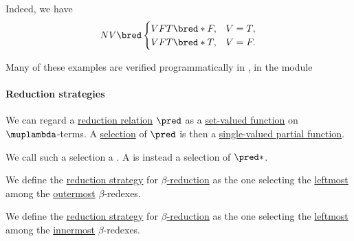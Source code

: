 \begin{example}
\begin{thmenum}
    Indeed, we have
    \begin{equation*}
      NV \bred \begin{cases}
        VFT \bred* F, &V = T, \\
        VFT \bred* T, &V = F.
      \end{cases}
    \end{equation*}
  \end{thmenum}
\end{example}
\begin{comments}
  \item Many of these examples are verified programmatically in \cite{notebook:code}, in the module
  \begin{CodeRefDisplay}
  \end{CodeRefDisplay}
\end{comments}

\paragraph{Reduction strategies}

\begin{definition}\label{def:reduction_strategy}
  We can regard a \hyperref[def:lambda_term_reduction]{reduction relation} \( {\pred} \) as a \hyperref[def:set_valued_function]{set-valued function} on \( \muplambda \)-terms. A \hyperref[def:set_valued_selection]{selection} of \( {\pred} \) is then a \hyperref[def:partial_function]{single-valued partial function}.

  We call such a selection a . A  is instead a selection of \( {\pred*} \).
\end{definition}

\begin{definition}\label{def:normal_order_reduction}
  We define the  \hyperref[def:reduction_strategy]{reduction strategy} for \hyperref[def:beta_eta_reduction]{\( \beta \)-reduction} as the one selecting the \hyperref[def:subterm_occurrence_ordering/horizontal]{leftmost} among the \hyperref[def:subterm_occurrence_ordering/vertical]{outermost} \( \beta \)-redexes.
\end{definition}

\begin{definition}\label{def:applicative_order_reduction}
  We define the  \hyperref[def:reduction_strategy]{reduction strategy} for \hyperref[def:beta_eta_reduction]{\( \beta \)-reduction} as the one selecting the \hyperref[def:subterm_occurrence_ordering/horizontal]{leftmost} among the \hyperref[def:subterm_occurrence_ordering/vertical]{innermost} \( \beta \)-redexes.
\end{definition}


